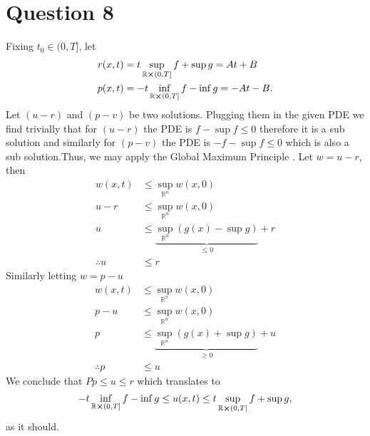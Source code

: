\documentclass[
	12pt,
	]{article}
\theoremstyle{definition}
\theoremstyle{definition}
\theoremstyle{definition}
\theoremstyle{definition}
\theoremstyle{definition}
\theoremstyle{example}
\theoremstyle{note}
\theoremstyle{remark}
\theoremstyle{example}
\begin{document}
		\section*{Question 8}
			Fixing $t_{0} \in (0,T]$, let 
			\begin{align*}
				r(x,t) &= t \sup\limits_{\mathbb{R} \cross (0,T]} f + \sup g = At +B \\
				p(x,t) &= -t \inf\limits_{\mathbb{R} \cross (0,T]} f - \inf g = -At -B.
			\end{align*}
			Let $(u-r)$ and $(p-v)$ be two solutions. Plugging them in the given PDE we find trivially that for  $(u-r)$ the PDE is $f-\sup f \le 0$ therefore it is a sub solution and similarly for $(p-v)$  the PDE is $-f - \sup f \le 0$ which is also a sub solution.Thus, we may apply the Global Maximum Principle .
			Let $w = u-r$, then 
			\begin{align*}
				w(x,t) &\le \sup\limits_{\mathbb{R}^{n}}w(x,0)  \\
				u-r &\le \sup\limits_{\mathbb{R}^{n}}w(x,0) \\
				u &\le \underbrace{\sup\limits_{\mathbb{R}^{n}}(g(x) - \sup g)}_{\le 0} +r\\
				\therefore u &\le r
			\end{align*} 
			Similarly letting $w = p-u$
			\begin{align*}
			w(x,t) &\le \sup\limits_{\mathbb{R}^{n}}w(x,0)  \\
			p-u &\le \sup\limits_{\mathbb{R}^{n}}w(x,0) \\
			p &\le \underbrace{\sup\limits_{\mathbb{R}^{n}}(g(x) + \sup g)}_{\ge 0} +u\\
			\therefore p &\le u
			\end{align*} 
			We conclude that $Pp \le u \le r$ which translates to 
			$$ -t \inf\limits_{\mathbb{R} \cross (0,T]} f - \inf g \le u(x,t) \le t \sup\limits_{\mathbb{R} \cross (0,T]} f + \sup g,$$
			as it should.
\end{document}
